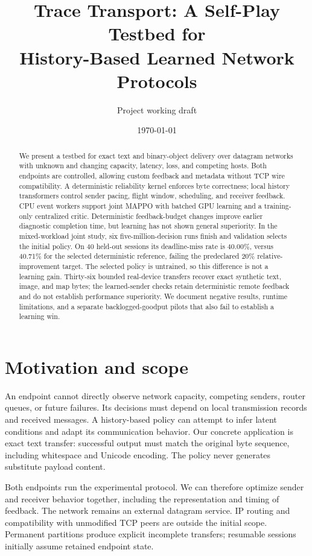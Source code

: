 \documentclass[11pt]{article}
\title{Trace Transport: A Self-Play Testbed for\\History-Based Learned Network Protocols}
\author{Project working draft}
\date{\today}
\begin{document}
\maketitle

\begin{abstract}
We present a testbed for exact text and binary-object delivery over datagram
networks with unknown and changing capacity, latency, loss, and competing hosts.
Both endpoints are controlled, allowing custom feedback and metadata without TCP
wire compatibility. A deterministic reliability kernel enforces byte correctness;
local history transformers control sender pacing, flight window, scheduling, and
receiver feedback. CPU event workers support joint MAPPO with batched GPU
learning and a training-only centralized critic. Deterministic feedback-budget
changes improve earlier diagnostic completion time, but learning has not shown
general superiority. In the mixed-workload joint study, six five-million-decision
runs finish and validation selects the initial policy. On 40 held-out sessions
its deadline-miss rate is 40.00\%, versus 40.71\% for the selected deterministic
reference, failing the predeclared 20\% relative-improvement target. The selected
policy is untrained, so this difference is not a learning gain. Thirty-six bounded
real-device transfers recover exact synthetic text, image, and map bytes; the
learned-sender checks retain deterministic remote feedback and do not establish
performance superiority. We document negative results, runtime limitations, and a
separate backlogged-goodput pilots that also fail to establish a learning win.
\end{abstract}

\section{Motivation and scope}
An endpoint cannot directly observe network capacity, competing senders, router
queues, or future failures. Its decisions must depend on local transmission
records and received messages. A history-based policy can attempt to infer
latent conditions and adapt its communication behavior. Our concrete application
is exact text transfer: successful output must match the original byte sequence,
including whitespace and Unicode encoding. The policy never generates substitute
payload content.

Both endpoints run the experimental protocol. We can therefore optimize sender
and receiver behavior together, including the representation and timing of
feedback. The network remains an external datagram service. IP routing and
compatibility with unmodified TCP peers are outside the initial scope. Permanent
partitions produce explicit incomplete transfers; resumable sessions initially
assume retained endpoint state.
\end{document}
